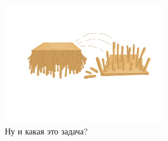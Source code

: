 \documentclass[10pt]{scrbook} \usepackage{modules/nonstahp_book}
\begin{document}
\begin{figure} \begin{center}
	\includegraphics[width=7cm]{figures/color/01}
	\vspace{1cm}
	\caption{Ну и какая это задача?}
\end{center} \end{figure}
\end{document}

